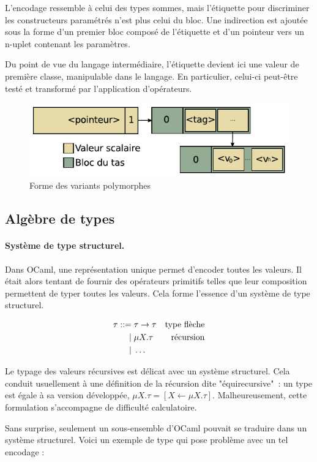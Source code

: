L'encodage ressemble à celui des types sommes, mais l'étiquette pour
discriminer les constructeurs paramétrés n'est plus celui du bloc. Une
indirection est ajoutée sous la forme d'un premier bloc composé de l'étiquette
et d'un pointeur vers un n-uplet contenant les paramètres.

Du point de vue du langage intermédiaire, l'étiquette devient ici une valeur de
première classe, manipulable dans le langage.  En particulier, celui-ci
peut-être testé et transformé par l'application d'opérateurs.

\begin{figure}
\centering
\includegraphics{media/ocaml_variant}
\caption{Forme des variants polymorphes}
\end{figure}

\subsection{Algèbre de types}

\paragraph{Système de type structurel.}
Dans OCaml, une représentation unique permet d'encoder toutes les valeurs. Il
était alors tentant de fournir des opérateurs primitifs telles que leur
composition permettent de typer toutes les valeurs. Cela forme l'essence d'un
système de type structurel.

\begin{align*}
  \tau ::=& \; \tau \rightarrow \tau
    & \text{type flèche}
  \\ |& \;     \mu X . \tau
    & \text{récursion}
  \\ |& \;     \ldots
\end{align*}

Le typage des valeurs récursives est délicat avec un système structurel. Cela
conduit usuellement à une définition de la récursion dite "équirecursive" : un
type est égale à sa version développée,
  $\mu X . \tau = [X \leftarrow \mu X . \tau]$.
Malheureusement, cette formulation s'accompagne de difficulté calculatoire.

Sans surprise, seulement un sous-ensemble d'OCaml pouvait se traduire dans un
système structurel. Voici un exemple de type qui pose problème avec un tel
encodage :

